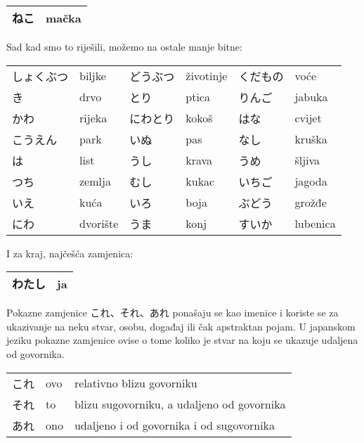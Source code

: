 	\begin{tabular}{|l|l|}
		\hline
		ねこ&mačka\\\hline
	\end{tabular}
	\vspace{10pt}
	
	Sad kad smo to riješili, možemo na ostale manje bitne:
	
	\vspace{10pt}
	\begin{tabular}{l l l l l l}
		\toprule[2pt]
		しょくぶつ&biljke&どうぶつ&životinje&くだもの&voće\\
		き&drvo&とり&ptica&りんご&jabuka\\
		かわ&rijeka&にわとり&kokoš&はな&cvijet\\
		こうえん&park&いぬ&pas&なし&kruška\\
		は&list&うし&krava&うめ&šljiva\\
		つち&zemlja&むし&kukac&いちご&jagoda\\
		いえ&kuća&いろ&boja&ぶどう&grožđe\\
		にわ&dvorište&うま&konj&すいか&lubenica\\
		\bottomrule[2pt]
	\end{tabular}

	
	\vspace{10pt}
	I za kraj, najčešća zamjenica:
	
	\vspace{10pt}
	\begin{tabular}{|l|l|}
		\hline
		わたし&ja\\\hline
	\end{tabular}
	\vspace{10pt}

	

	Pokazne zamjenice これ、それ、あれ ponašaju se kao imenice i koriste se za ukazivanje na neku stvar, osobu, događaj ili čak apstraktan pojam. U japanskom jeziku pokazne zamjenice ovise o tome koliko je stvar na koju se ukazuje udaljena od govornika.
	
	\vspace{10pt}
	\begin{tabular}{l l l}
		\toprule[2pt]
		これ&ovo&relativno blizu govorniku\\
		それ&to&blizu sugovorniku, a udaljeno od govornika\\
		あれ&ono&udaljeno i od govornika i od sugovornika\\
		\bottomrule[2pt]
	\end{tabular}
	\vspace{10pt}

